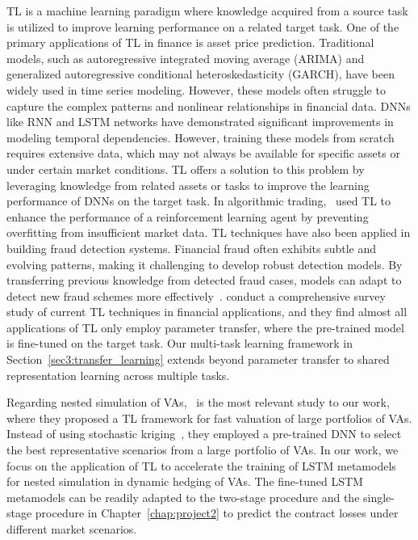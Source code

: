 TL is a machine learning paradigm where knowledge acquired from a source task is utilized to improve learning performance on a related target task.
One of the primary applications of TL in finance is asset price prediction. 
Traditional models, such as autoregressive integrated moving average (ARIMA) and generalized autoregressive conditional heteroskedasticity (GARCH), have been widely used in time series modeling.
However, these models often struggle to capture the complex patterns and nonlinear relationships in financial data.
DNNs like RNN and LSTM networks have demonstrated significant improvements in modeling temporal dependencies. 
However, training these models from scratch requires extensive data, which may not always be available for specific assets or under certain market conditions.
TL offers a solution to this problem by leveraging knowledge from related assets or tasks to improve the learning performance of DNNs on the target task.
In algorithmic trading,~\cite{jeong2019improving} used TL to enhance the performance of a reinforcement learning agent by preventing overfitting from insufficient market data.
TL techniques have also been applied in building fraud detection systems. 
Financial fraud often exhibits subtle and evolving patterns, making it challenging to develop robust detection models.
By transferring previous knowledge from detected fraud cases, models can adapt to detect new fraud schemes more effectively~\citep{lebichot2021transfer}.
\cite{yan2024comprehensive} conduct a comprehensive survey study of current TL techniques in financial applications, and they find almost all applications of TL only employ parameter transfer, where the pre-trained model is fine-tuned on the target task.
Our multi-task learning framework in Section~\ref{sec3:transfer_learning} extends beyond parameter transfer to shared representation learning across multiple tasks.

Regarding nested simulation of VAs,~\cite{cheng2019fast} is the most relevant study to our work, where they proposed a TL framework for fast valuation of large portfolios of VAs.
Instead of using stochastic kriging~\citep{gan2015valuation}, they employed a pre-trained DNN to select the best representative scenarios from a large portfolio of VAs.
In our work, we focus on the application of TL to accelerate the training of LSTM metamodels for nested simulation in dynamic hedging of VAs.
The fine-tuned LSTM metamodels can be readily adapted to the two-stage procedure and the single-stage procedure in Chapter~\ref{chap:project2} to predict the contract losses under different market scenarios.

